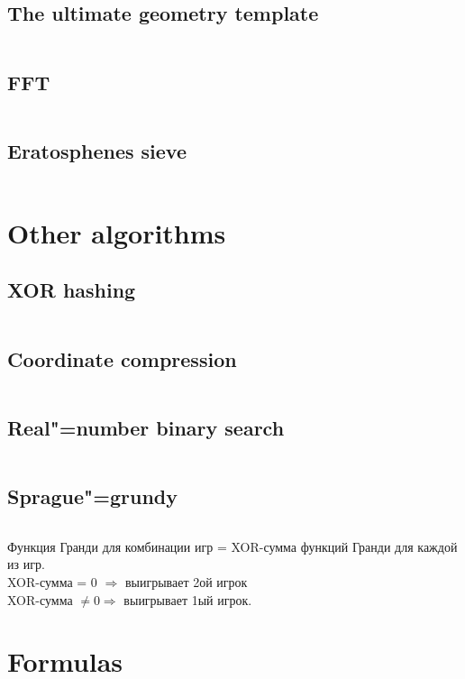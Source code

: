 ﻿\documentclass[10pt,twocolumn,oneside]{article}
\begin{document}
\subsection{The ultimate geometry template}
\inputminted[breaklines]{python}{Maths/geometry.py}
\subsection{FFT}
\inputminted[breaklines]{python}{Maths/fft.py}
\subsection{Eratosphenes sieve}
\inputminted[breaklines]{cpp}{Maths/sieve.cpp}

\section{Other algorithms}
\subsection{XOR hashing}
\inputminted[breaklines]{cpp}{Other algorithms/xor-hashing.cpp}
\subsection{Coordinate compression}
\inputminted[breaklines]{cpp}{Other algorithms/coordinate compression.cpp}
\subsection{Real"=number binary search}
\inputminted[breaklines]{cpp}{Other algorithms/float binsearch.cpp}
\subsection{Sprague"=grundy}
\inputminted[breaklines]{cpp}{Other algorithms/sprague-grundy.cpp}
Функция Гранди для комбинации игр = XOR-сумма функций Гранди для каждой из игр.\\
XOR-сумма = 0 $\Rightarrow$ выигрывает 2ой игрок\\
XOR-сумма $\ne 0 \Rightarrow$ выигрывает 1ый игрок.\\

\section{Formulas}

\end{document}
